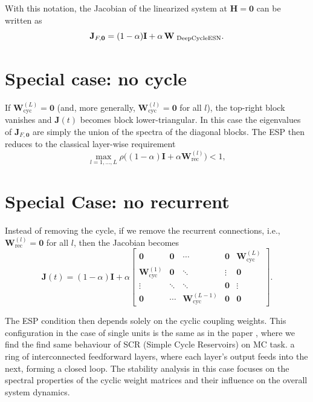 With this notation, the Jacobian of the linearized system at $\mathbf{H}=\mathbf{0}$ can be written as
\begin{equation}
\mathbf{J}_{F,\mathbf{0}} = (1-\alpha)\mathbf{I} + \alpha\,\mathbf{W}_{\text{ DeepCycleESN}}.
\label{eq:dcr-J-linearised}
\end{equation}

\section{Special case: no cycle}
\label{sec:dcr-nocycle}

If $\mathbf{W}_{\text{cyc}}^{(L)}=\mathbf{0}$ (and, more generally, $\mathbf{W}_{\text{cyc}}^{(l)}=\mathbf{0}$ for all $l$), the top-right block vanishes and $\mathbf{J}(t)$ becomes block lower-triangular. In this case the eigenvalues of $\mathbf{J}_{F,\mathbf{0}}$ are simply the union of the spectra of the diagonal blocks. The ESP then reduces to the classical layer-wise requirement
\[
\max_{l=1,\dots,L} \rho\!\big((1-\alpha)\mathbf{I} + \alpha\mathbf{W}_{\text{rec}}^{(l)}\big) < 1,
\]

\section{Special Case: no recurrent}
Instead of removing the cycle, if we remove the recurrent connections, i.e., $\mathbf{W}_{\text{rec}}^{(l)}=\mathbf{0}$ for all $l$, then the Jacobian becomes
\[
\mathbf{J}(t) = (1-\alpha)\mathbf{I} + \alpha
\begin{bmatrix} 
\mathbf{0} & \mathbf{0} & \cdots & \mathbf{0} & \mathbf{W}_{\text{cyc}}^{(L)} \\
\mathbf{W}_{\text{cyc}}^{(1)} & \mathbf{0} & \ddots & \vdots & \mathbf{0} \\
\vdots & \ddots & \ddots & \mathbf{0} & \vdots \\
\mathbf{0} & \cdots & \mathbf{W}_{\text{cyc}}^{(L-1)} & \mathbf{0} & \mathbf{0}
\end{bmatrix}.
\]

The ESP condition then depends solely on the cyclic coupling weights. This configuration in the case of single units is the same as in the paper \cite{mincomplex}, 
where we find the find same behaviour of SCR (Simple Cycle Reservoirs) on MC task. 
 a ring of interconnected feedforward layers, where each layer's output feeds into the next, forming a closed loop. The stability analysis in this case focuses on the spectral properties of the cyclic weight matrices and their influence on the overall system dynamics.

